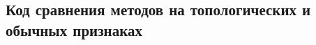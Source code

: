 


	
	
	
	
	
	
	
	
	
	
	\newpage  
	\nocite{*}
	\printbibliography[title={Список использованных источников}]
	\begin{appendices}
		\section{Код сравнения методов на топологических и обычных признаках}
		
	\end{appendices}
